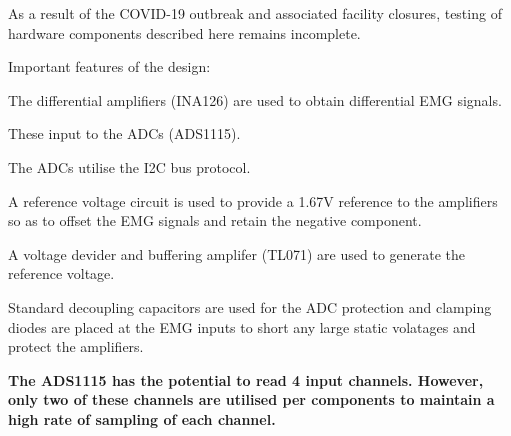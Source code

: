 As a result of the C\+O\+V\+I\+D-\/19 outbreak and associated facility closures, testing of hardware components described here remains incomplete.

Important features of the design\+:


\begin{DoxyEnumerate}
\item The differential amplifiers (I\+N\+A126) are used to obtain differential E\+MG signals.
\begin{DoxyEnumerate}
\item These input to the A\+D\+Cs (A\+D\+S1115).
\end{DoxyEnumerate}
\begin{DoxyEnumerate}
\item The A\+D\+Cs utilise the I2C bus protocol.
\end{DoxyEnumerate}
\item A reference voltage circuit is used to provide a 1.\+67V reference to the amplifiers so as to offset the E\+MG signals and retain the negative component.
\item A voltage devider and buffering amplifer (T\+L071) are used to generate the reference voltage.
\item Standard decoupling capacitors are used for the A\+DC protection and clamping diodes are placed at the E\+MG inputs to short any large static volatages and protect the amplifiers.
\end{DoxyEnumerate}

{\bfseries{The A\+D\+S1115 has the potential to read 4 input channels. However, only two of these channels are utilised per components to maintain a high rate of sampling of each channel.}} 